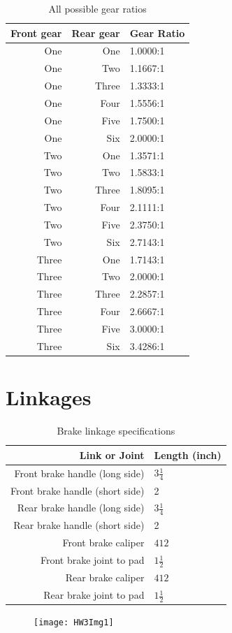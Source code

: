 \documentclass[11pt]{article}
\begin{document}
\begin{table}[H]
	\centering
	\begin{tabular}{|r|r|l|}
		\hline
		\textbf{Front gear} & \textbf{Rear gear} & \textbf{Gear Ratio} \\
		\hline
		One & One & 1.0000:1 \\
		One & Two & 1.1667:1 \\
		One & Three & 1.3333:1 \\
		One & Four & 1.5556:1 \\
		One & Five & 1.7500:1 \\
		One & Six & 2.0000:1 \\
		\hline
		Two & One & 1.3571:1 \\
		Two & Two & 1.5833:1 \\
		Two & Three & 1.8095:1 \\
		Two & Four & 2.1111:1 \\
		Two & Five & 2.3750:1 \\
		Two & Six & 2.7143:1 \\
		\hline
		Three & One & 1.7143:1 \\
		Three & Two & 2.0000:1 \\
		Three & Three & 2.2857:1 \\
		Three & Four & 2.6667:1 \\
		Three & Five & 3.0000:1 \\
		Three & Six & 3.4286:1 \\
		\hline
	\end{tabular}
	\caption{All possible gear ratios}
\end{table}

\section*{Linkages}
\begin{table}[H]
	\centering
	\begin{tabular}{|r|l|}
		\hline
		\textbf{Link or Joint} & \textbf{Length (inch)} \\
		\hline
		Front brake handle (long side) & \(3\frac{1}{4}\) \\
		\hline
		Front brake handle (short side) & 2 \\
		\hline
		Rear brake handle (long side) & \(3\frac{1}{4}\) \\
		\hline
		Rear brake handle (short side) & 2 \\
		\hline
		Front brake caliper & \(4{1}{2}\) \\
		\hline
		Front brake joint to pad & \(1\frac{1}{2}\) \\
		\hline
		Rear brake caliper & \(4{1}{2}\) \\
		\hline
		Rear brake joint to pad & \(1\frac{1}{2}\) \\
		\hline
	\end{tabular}
	\caption{Brake linkage specifications}
\end{table}
\begin{figure}[H]
	\centering
	\texttt{[image: HW3Img1]}
\end{figure}
\end{document}
